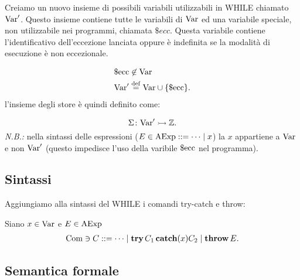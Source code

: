 Creiamo un nuovo insieme di possibili variabili utilizzabili in WHILE
chiamato $\mathrm{Var}'$. Questo insieme contiene tutte le variabili di $\mathrm{Var}$
ed una variabile speciale, non utilizzabile nei programmi, chiamata
$\$ecc$. Questa variabile contiene l'identificativo dell'eccezione
lanciata oppure è indefinita se la modalità di esecuzione è non
eccezionale.

\begin{align*}
  &\ecc \not \in \Var \\
  &\Var' \defeq \Var \union \{\ecc\}.
\end{align*}
l'insieme degli store è quindi definito come:

\[
  \mathord{\Sigma}\colon\mathrm{Var}'\rightarrowtail\mathbb{Z}.
\]
\emph{N.B.:} nella sintassi delle espressioni ($E \in \AExp ::= \dots
\vbar x$) la $x$ appartiene a $\mathrm{Var}$ e non $\mathrm{Var}'$ (questo
impedisce l'uso della varibile $\mathrm{\$ecc}$ nel programma).

\subsection{Sintassi}
Aggiungiamo alla sintassi del WHILE i comandi try-catch e throw:

Siano $x \in \mathrm{Var}$ e $E \in \mathrm{AExp}$
\begin{align*}
\Com \ni C ::= \dots \vbar \kw{try} C_1 \kw{catch}(x) C_2\vbar \kw{throw} E.
\end{align*}

\subsection{Semantica formale}

